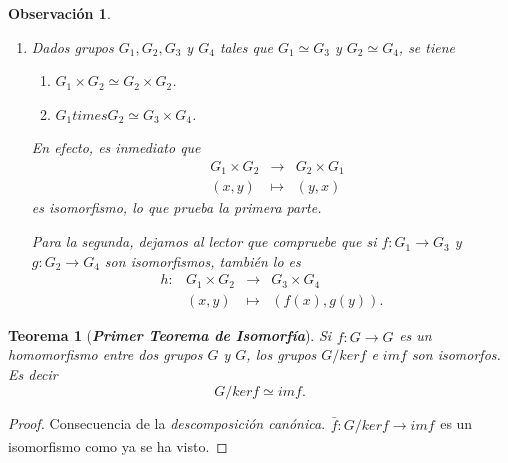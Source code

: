 \documentclass[12pt]{article}
\newtheorem{theorem}{Teorema}[section]
\newtheorem{observation}{Observación}[theorem]
\begin{document}
\begin{observation}
\begin{enumerate}
\begin{enumerate}
Si $\phi(g) = \phi(h)$ entonces $f \circ g \circ f^{-1} = f \circ h \circ f^{-1}$, luego $f^{-1} \circ f \circ g \circ f^{-1} \circ f = f^{-1} \circ f \circ h \circ f^{-1} \circ f,$ y por lo tanto $g = h$. Así, $\phi$ es inyectiva.

Por último, para cada $l \in Biy(Y)$, existe $g = f^{-1} \circ l \circ f \in Biy(X)$ tal que $\phi(g) = f \circ f^{-1} \circ l \circ f \circ f^{-1} = l,$ lo que prueba la sobreyectividad de $\phi$.
\item Dados grupos $G_1, G_2, G_3$ y $G_4$ tales que $G_1 \simeq G_3$ y $G_2 \simeq G_4$, se tiene 
\begin{enumerate}
\item $G_1 \times G_2 \simeq G_2 \times G_2$.
\item $G_1 times G_2 \simeq G_3 \times G_4$.
\end{enumerate}

En efecto, es inmediato que $$\begin{array}{rccl}
&G_1 \times G_2& \longrightarrow &G_2 \times G_1\\
&(x,y)& \longmapsto &(y,x)
\end{array}
$$ es isomorfismo, lo que prueba la primera parte. 

Para la segunda, dejamos al lector que compruebe que si $f \colon G_1 \longrightarrow G_3$ y $g \colon G_2 \longrightarrow G_4$ son isomorfismos, también lo es $$\begin{array}{rccl}
h\colon &G_1 \times G_2& \longrightarrow &G_3 \times G_4\\
&(x,y)& \longmapsto &(f(x), g(y)).
\end{array}
$$
\end{enumerate}
\end{enumerate}
\end{observation}

\begin{theorem}[\textit{\textbf{Primer Teorema de Isomorfía}}]
Si$
\begin{array}{rccl}
f\colon G \longrightarrow  G
\end{array}
$es un homomorfismo entre dos grupos $G$ y $G$, los grupos $G/ker f$ e $im f$ son isomorfos. Es decir
$$G/ker f \simeq im f.$$
\end{theorem}
\begin{proof} 
Consecuencia de la \textit{descomposición canónica}.$
\begin{array}{rccl}
\bar{f}\colon G/ker f \longrightarrow  im f
\end{array}
$es un isomorfismo como ya se ha visto.

\end{proof}
\end{document}
